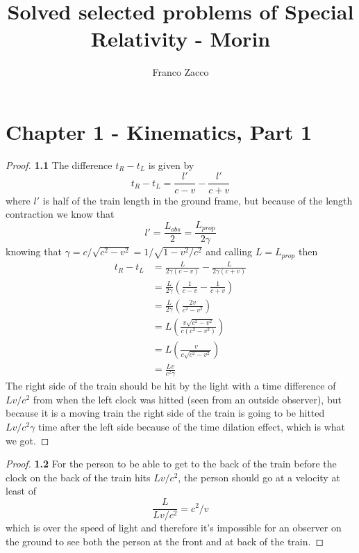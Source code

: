 \documentclass[11pt]{article}
\title{\textbf{Solved selected problems of Special Relativity - Morin}}
\author{Franco Zacco}
\date{}
\theoremstyle{definition}
\begin{document}
\maketitle
\thispagestyle{empty}

\section*{Chapter 1 - Kinematics, Part 1}

	\begin{proof}{\textbf{1.1}}
        The difference $t_R - t_L$ is given by
        $$t_R - t_L = \frac{l'}{c-v} - \frac{l'}{c+v}$$
        where $l'$ is half of the train length in the ground frame, but because
        of the length contraction we know that
        $$l' = \frac{L_{obs}}{2} = \frac{L_{prop}}{2\gamma}$$
        knowing that $\gamma = c/\sqrt{c^2 - v^2} = 1/\sqrt{1 - v^2/c^2}$ and
        calling $L = L_{prop}$ then
        \begin{align*}
            t_R - t_L &= \frac{L}{2\gamma(c-v)} - \frac{L}{2\gamma(c+v)}\\
                      &= \frac{L}{2\gamma}\left(\frac{1}{c-v}- \frac{1}{c+v}\right)\\
                      &= \frac{L}{2\gamma}\left(\frac{2v}{c^2-v^2}\right)\\
                      &= L\left(\frac{v\sqrt{c^2-v^2}}{c(c^2-v^2)}\right)\\
                      &= L\left(\frac{v}{c\sqrt{c^2-v^2}}\right)\\
                      &= \frac{Lv}{c^2\gamma}
        \end{align*}
        The right side of the train should be hit by the light with a time
        difference of $Lv/c^2$ from when the left clock was hitted (seen from
        an outside observer), but because it is a moving train the right side
        of the train is going to be hitted $Lv/c^2\gamma$ time after the left
        side because of the time dilation effect, which is what we got.   
    \end{proof}
\cleardoublepage
	\begin{proof}{\textbf{1.2}}
        For the person to be able to get to the back of the train before the
        clock on the back of the train hits $Lv/c^2$, the person should go at
        a velocity at least of 
        $$\frac{L}{Lv/c^2} = c^2/v$$
        which is over the speed of light and therefore it's impossible for an
        observer on the ground to see both the person at the front and at 
        back of the train. 
    \end{proof}
\end{document}
